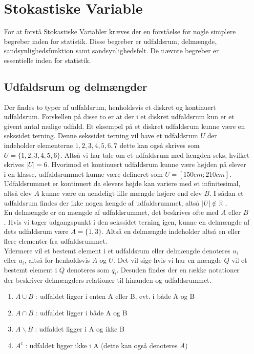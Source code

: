 \documentclass[../../SRP.tex]{subfiles}
\begin{document}
\chapter{Stokastiske Variable}

For at forstå Stokastiske Variabler kræves der en forståelse for nogle simplere begreber inden for statistik. Disse begreber er udfaldsrum, delmængde, sandsynlighedsfunktion samt sandsynlighedsfelt. De nævnte begreber er essentielle inden for statistik.

\section{Udfaldsrum og delmængder}

Der findes to typer af udfaldsrum, henholdsvis et diskret og kontinuert udfaldsrum. Forskellen på disse to er at der i et diskret udfaldsrum kun er et givent antal mulige udfald. Et eksempel på et diskret udfaldsrum kunne være en sekssidet terning. Denne sekssidet terning vil have et udfaldsrum $U$ der indeholder elementerne $1,2,3,4,5,6,7$ dette kan også skrives som $U = \{1,2,3,4,5,6\}$. Altså vi har tale om et udfaldsrum med længden seks, hvilket skrives $|U| = 6$. Hvorimod et kontinuert udfaldsrum kunne være højden på elever i en klasse, udfaldsrummet kunne være defineret som $U = [150cm;210cm]$. Udfaldsrummet er kontinuert da elevers højde kan variere med et infinitesimal, altså elev $A$ kunne være en uendeligt lille mængde højere end elev $B$. I sådan et udfaldsrum findes der ikke nogen længde af udfaldsrummet, altså $|U| \notin \mathbb{R}$ \cite{SC}. \\

En delmængde er en mængde af udfaldsrummet, det beskrives ofte med $A$ eller $B$. Hvis vi tager udgangspunkt i den sekssidet terning igen, kunne en delmængde af dets udfaldsrum være $A = \{1,3\}$. Altså en delmængde indeholder altså en eller flere elementer fra udfaldsrummet. \\

Ydermere vil et bestemt element i et udfaldsrum eller delmængde denoteres $u_i$ eller $a_i$, altså for henholdsvis $A$ og $U$. Det vil sige hvis vi har en mængde $Q$ vil et bestemt element i $Q$ denoteres som $q_i$. Desuden findes der en række notationer der beskriver delmængders relationer til hinanden og udfaldsrummet.
\begin{enumerate}
  \item $A \cup B$ : udfaldet ligger i enten A eller B, evt. i både A og B
  \item $A \cap B$ : udfaldet ligger i både A og B
  \item $A \backslash B$ : udfaldet ligger i A og ikke B
  \item $A^c$ : udfaldet ligger ikke i A (dette kan også denoteres $\bar{A}$)
\end{enumerate}
\end{document}
